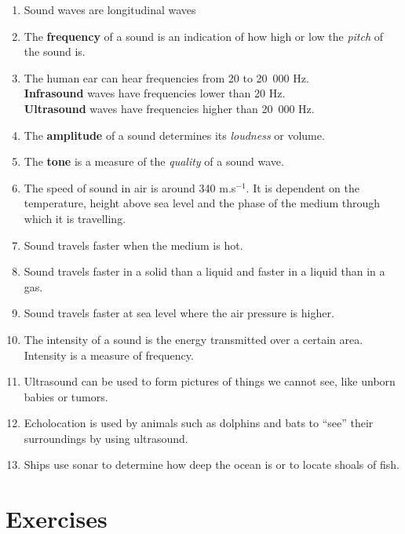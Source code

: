 \begin{enumerate}
\item Sound waves are longitudinal waves
\item The \textbf{frequency} of a sound is an indication of how high or low the \emph{pitch} of the sound is.
\item The human ear can hear frequencies from 20 to 20~000 Hz. \\
\textbf{Infrasound} waves have frequencies lower than 20 Hz. \\
\textbf{Ultrasound} waves have frequencies higher than 20~000 Hz.
\item The \textbf{amplitude} of a sound determines its \emph{loudness} or volume.
\item The \textbf{tone} is a measure of the \emph{quality} of a sound wave.
\item The speed of sound in air is around 340 m.s$^{-1}$. It is dependent on the temperature, height above sea level and the phase of the medium through which it is travelling.
\item Sound travels faster when the medium is hot.
\item Sound travels faster in a solid than a liquid and faster in a liquid than in a gas.
\item Sound travels faster at sea level where the air pressure is higher.
\item The intensity of a sound is the energy transmitted over a certain area. Intensity is a measure of frequency.
\item Ultrasound can be used to form pictures of things we cannot see, like unborn babies or tumors.
\item Echolocation is used by animals such as dolphins and bats to ``see'' their surroundings by using ultrasound.
\item Ships use sonar to determine how deep the ocean is or to locate shoals of fish.
\end{enumerate}

\section{Exercises}

